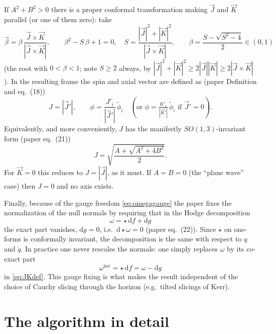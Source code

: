\documentclass[11pt]{article}
\newcommand{\dd}{\mathrm{d}}
\newcommand{\qo}{\mathring{q}}          %
\newcommand{\vJ}{\vec{J}}
\newcommand{\vK}{\vec{K}}
\newcommand{\vbeta}{\vec{\beta}}
\begin{document}
If $A^2+B^2>0$ there is a proper conformal transformation making $\vJ$ and
$\vK$ parallel (or one of them zero): take
\begin{equation}
  \vbeta = \beta\,\frac{\vJ\times\vK}{|\vJ\times\vK|},
  \qquad
  \beta^2 - S\,\beta + 1 = 0,\quad
  S = \frac{|\vJ|^2+|\vK|^2}{|\vJ\times\vK|},
  \qquad
  \beta = \frac{S - \sqrt{S^2-4}}{2}\in(0,1)
  \label{eq:betacondition}
\end{equation}
(the root with $0<\beta<1$; note $S\ge 2$ always, by
$|\vJ|^2+|\vK|^2 \ge 2|\vJ||\vK| \ge 2|\vJ\times\vK|$).  In the resulting
frame the spin and axial vector are defined as (paper Definition and
eq.~(18))
\begin{equation}
  J = |\vJ'|,
  \qquad
  \phi = \frac{J'_i}{|\vJ'|}\,\tilde\phi_i
  \quad (\text{or } \phi = \tfrac{K'_i}{|\vK'|}\,\tilde\phi_i
  \text{ if } \vJ'=0).
  \label{eq:axialvector}
\end{equation}
Equivalently, and more conveniently, $J$ has the manifestly
$SO(1,3)$-invariant form (paper eq.~(21))
\begin{equation}
  \boxed{\;
  J = \sqrt{\frac{A + \sqrt{A^2 + 4B^2}}{2}} .
  \;}
  \label{eq:Jinvariant}
\end{equation}
For $\vK=0$ this reduces to $J=|\vJ|$, as it must.  If $A=B=0$ (the ``plane
wave'' case) then $J=0$ and no axis exists.

Finally, because of the gauge freedom \eqref{eq:omegagauge} the paper fixes
the normalization of the null normals by requiring that in the Hodge
decomposition
\begin{equation}
  \omega = \star\,\dd f + \dd g
  \label{eq:hodge}
\end{equation}
the exact part vanishes, $\dd g = 0$, i.e.\ $\dd{\star}\omega = 0$ (paper
eq.~(22)).  Since $\star$ on one-forms is conformally invariant, the
decomposition is the same with respect to $q$ and $\qo$.  In practice one
never rescales the normals: one simply replaces $\omega$ by its co-exact part
\begin{equation}
  \omega^{\mathrm{inv}} = \star\,\dd f = \omega - \dd g
  \label{eq:omegainv}
\end{equation}
in \eqref{eq:JKdef}.  This gauge fixing is what makes the result independent
of the choice of Cauchy slicing through the horizon (e.g.\ tilted slicings of
Kerr).

\section{The algorithm in detail}
\label{sec:algorithm}
\end{document}
